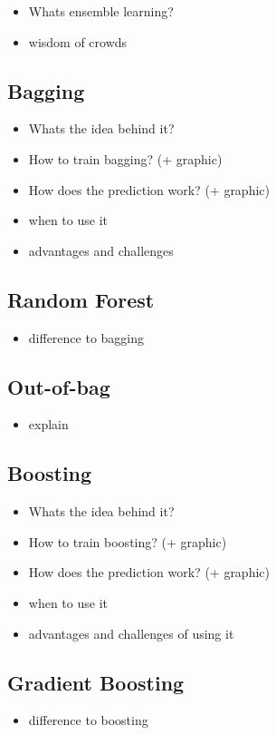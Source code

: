\begin{itemize}
    \item Whats ensemble learning?
    \item wisdom of crowds
\end{itemize}

\subsection{Bagging}
\begin{itemize}
    \item Whats the idea behind it?
    \item How to train bagging? (+ graphic)
    \item How does the prediction work? (+ graphic)
    \item when to use it
    \item advantages and challenges
\end{itemize}

\subsection{Random Forest}
\begin{itemize}
    \item difference to bagging
\end{itemize}

\subsection{Out-of-bag}
\begin{itemize}
    \item explain
\end{itemize}

\subsection{Boosting}
\begin{itemize}
    \item Whats the idea behind it?
    \item How to train boosting? (+ graphic)
    \item How does the prediction work? (+ graphic)
    \item when to use it
    \item advantages and challenges of using it
\end{itemize}

\subsection{Gradient Boosting}
\begin{itemize}
    \item difference to boosting
\end{itemize}

